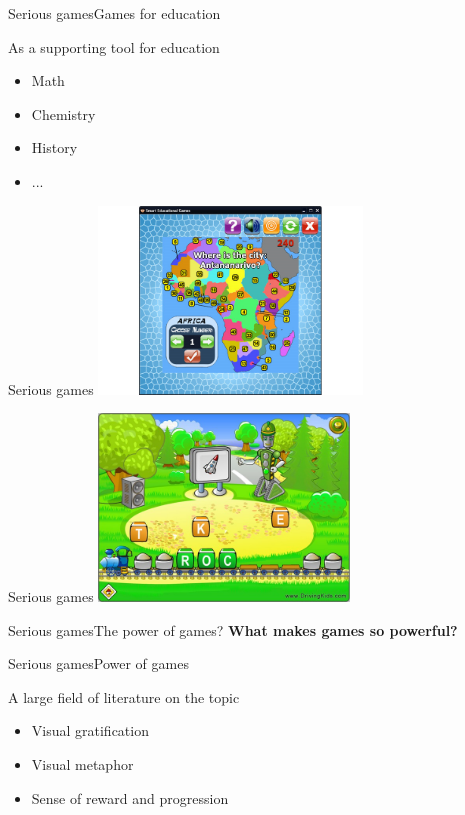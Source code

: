 \documentclass{beamer}
\begin{document}
\begin{slide}{Serious games}{Games for education}{
\item As a supporting tool for education \cite{GAMES_FOR_EDUCATION}
\begin{itemize}
\item Math
\item Chemistry
\item History
\item ...
\end{itemize}
}\end{slide}

\begin{frame}{Serious games}
\center
\includegraphics[height=5cm]{Pics/game_for_education.png}
\end{frame}

\begin{frame}{Serious games}
\center
\includegraphics[height=5cm]{Pics/game_for_education_2.png}
\end{frame}

\begin{textslide}{Serious games}{The power of games?}{
\textbf{What makes games so powerful?}
}\end{textslide}

\begin{slide}{Serious games}{Power of games}{
\item A large field of literature on the topic
\begin{itemize}
\item Visual gratification
\item Visual metaphor
\item Sense of reward and progression
\end{itemize}
}\end{slide}
\end{document}
